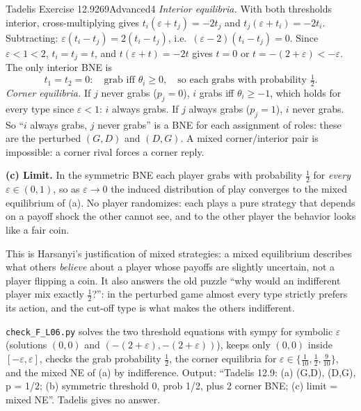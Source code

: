 \begin{exsol}{Tadelis Exercise 12.9}{269}{Advanced}{4}
\emph{Interior equilibria.} With both thresholds interior, cross-multiplying gives
$t_i(\varepsilon + t_j) = -2t_j$ and $t_j(\varepsilon + t_i) = -2t_i$. Subtracting:
$\varepsilon(t_i - t_j) = 2(t_i - t_j)$, i.e.\ $(\varepsilon - 2)(t_i - t_j) = 0$. Since $\varepsilon < 1 < 2$,
$t_i = t_j = t$, and $t(\varepsilon + t) = -2t$ gives $t = 0$ or $t = -(2 + \varepsilon) <
-\varepsilon$. The only interior BNE is
\[
  t_1 = t_2 = 0: \quad \text{grab iff } \theta_i \ge 0, \quad\text{so each grabs with probability } \tfrac12 .
\]
\emph{Corner equilibria.} If $j$ never grabs ($p_j = 0$), $i$ grabs iff $\theta_i \ge -1$, which holds for
every type since $\varepsilon < 1$: $i$ always grabs. If $j$ always grabs ($p_j = 1$), $i$ never grabs.
So ``$i$ always grabs, $j$ never grabs'' is a BNE for each assignment of roles: these are the perturbed
$(G,D)$ and $(D,G)$. A mixed corner/interior pair is impossible: a corner rival forces a corner reply.

\textbf{(c) Limit.} In the symmetric BNE each player grabs with probability $\frac12$ for \emph{every}
$\varepsilon \in (0,1)$, so as $\varepsilon \to 0$ the induced distribution of play converges to the mixed
equilibrium of (a). No player randomizes: each plays a pure strategy that depends on a payoff shock the
other cannot see, and to the other player the behavior looks like a fair coin.

\interp This is Harsanyi's justification of mixed strategies: a mixed equilibrium describes what
others \emph{believe} about a player whose payoffs are slightly uncertain, not a player flipping a coin.
It also answers the old puzzle ``why would an indifferent player mix exactly $\frac12$?'': in the
perturbed game almost every type strictly prefers its action, and the cut-off type is what makes the
others indifferent.

\verify \texttt{check\_F\_L06.py} solves the two threshold equations with sympy for symbolic
$\varepsilon$ (solutions $(0,0)$ and $(-(2+\varepsilon), -(2+\varepsilon))$), keeps only $(0,0)$ inside
$[-\varepsilon,\varepsilon]$, checks the grab probability $\frac12$, the corner equilibria for
$\varepsilon \in \{\frac1{10}, \frac12, \frac9{10}\}$, and the mixed NE of (a) by indifference. Output:
``Tadelis 12.9: (a) (G,D), (D,G), p = 1/2; (b) symmetric threshold 0, prob 1/2, plus 2 corner BNE;
(c) limit = mixed NE''. Tadelis gives no answer.


\end{exsol}
